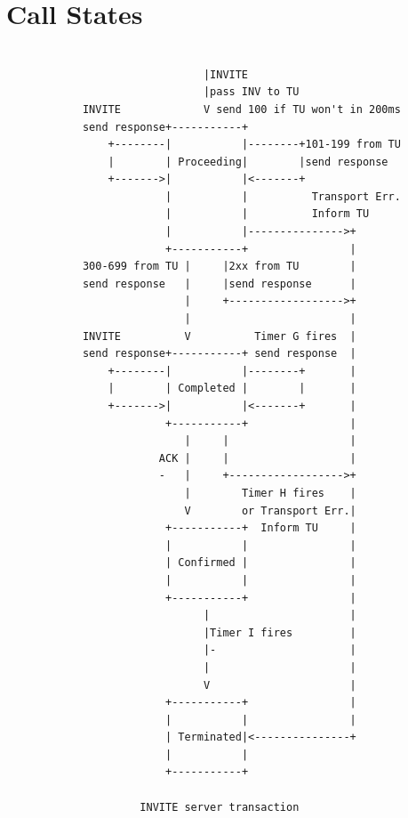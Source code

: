 \documentclass[a4paper]{article}
\begin{document}
\pagebreak
\section{Call States}

\begin{verbatim}

                               |INVITE
                               |pass INV to TU
            INVITE             V send 100 if TU won't in 200ms
            send response+-----------+
                +--------|           |--------+101-199 from TU
                |        | Proceeding|        |send response
                +------->|           |<-------+
                         |           |          Transport Err.
                         |           |          Inform TU
                         |           |--------------->+
                         +-----------+                |
            300-699 from TU |     |2xx from TU        |
            send response   |     |send response      |
                            |     +------------------>+
                            |                         |
            INVITE          V          Timer G fires  |
            send response+-----------+ send response  |
                +--------|           |--------+       |
                |        | Completed |        |       |
                +------->|           |<-------+       |
                         +-----------+                |
                            |     |                   |
                        ACK |     |                   |
                        -   |     +------------------>+
                            |        Timer H fires    |
                            V        or Transport Err.|
                         +-----------+  Inform TU     |
                         |           |                |
                         | Confirmed |                |
                         |           |                |
                         +-----------+                |
                               |                      |
                               |Timer I fires         |
                               |-                     |
                               |                      |
                               V                      |
                         +-----------+                |
                         |           |                |
                         | Terminated|<---------------+
                         |           |
                         +-----------+

                     INVITE server transaction
                     
\end{verbatim}
\end{document}

